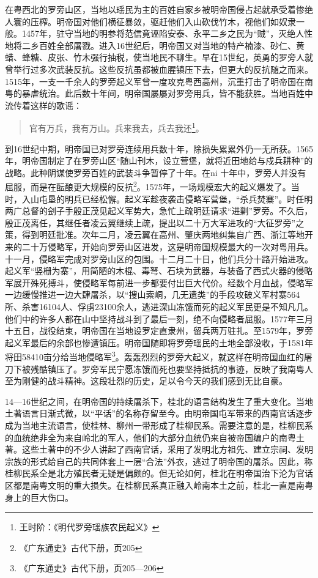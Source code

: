 在粤西北的罗旁山区，当地以瑶民为主的百姓自家乡被明帝国侵占起就承受着惨绝人寰的压榨。明帝国对他们横征暴敛，驱赶他们入山砍伐竹木，视他们如奴隶一般。1457年，驻守当地的明参将范信竟诬陷安泰、永平二乡之民为“贼”，灭绝人性地将二乡百姓全部屠戮。进入16世纪后，明帝国又对当地的特产楠漆、砂仁、黄蜡、蜂糖、皮张、竹木强行抽税，使当地民不聊生。早在15世纪，英勇的罗旁人就曾举行过多次武装反抗。这些反抗虽都被血腥镇压下去，但更大的反抗随之而来。1515年，一支一千余人的罗旁起义军曾一度攻克粤西高州，沉重打击了明帝国在南粤的暴虐统治。此后数十年间，明帝国屡屡对罗旁用兵，皆不能获胜。当地百姓中流传着这样的歌谣：

\begin{quote}

官有万兵，我有万山。兵来我去，兵去我还\footnote{王时阶：《明代罗旁瑶族农民起义》}。

\end{quote}

到16世纪中期，明帝国已对罗旁连续用兵数十年，除损失累累外仍一无所获。1565年，明帝国制定了在罗旁山区“随山刊木，设立营堡，就将近田地给与戍兵耕种”的战略。此种阴谋使罗旁百姓的武装斗争暂停了十年。在ni 十年中，罗旁人并没有屈服，而是在酝酿更大规模的反抗\footnote{《广东通史》古代下册，页205}。1575年，一场规模宏大的起义爆发了。当时，入山屯垦的明兵已经松懈。起义军趁夜袭击侵略军营堡，“杀兵焚寨”。时任明两广总督的刽子手殷正茂见起义军势大，急忙上疏明廷请求“进剿”罗旁。不久后，殷正茂离任，其继任者凌云翼继续上疏，提出以二十万大军进攻的“大征罗旁”之策，得到明廷批准。次年二月，凌云翼在高州、肇庆两地纠集自广西、浙江等地开来的二十万侵略军，开始向罗旁山区进发，这是明帝国规模最大的一次对粤用兵。十一月，侵略军完成对罗旁山区的包围。十二月二十日，他们兵分十路开始进攻。起义军“竖栅为寨”，用简陋的木棍、毒弩、石块为武器，与装备了西式火器的侵略军展开殊死搏斗，使侵略军每前进一步都要付出巨大代价。经数个月血战，侵略军一边缓慢推进一边大肆屠杀，以“搜山索峒，几无遗类”的手段攻破义军村寨564所、杀害16104人、俘虏23100余人，逃进深山冻饿而死的起义军民更是不知凡几。他们中的许多人都在山中坚持战斗到了最后一刻，绝不向侵略者屈服。1577年三月十五日，战役结束，明帝国在当地设罗定直隶州，留兵两万驻扎。至1579年，罗旁起义军最后的余部也惨遭镇压。明帝国随即将罗旁瑶民的土地全部没收，于1581年将田58410亩分给当地侵略军\footnote{《广东通史》古代下册，页205—206}。轰轰烈烈的罗旁大起义，就这样在明帝国血红的屠刀下被残酷镇压了。罗旁军民宁愿冻饿而死也要坚持抵抗的事迹，反映了我南粤人至为刚健的战斗精神。这段壮烈的历史，足以令今天的我们感到无比自豪。

14—16世纪之间，在明帝国的持续屠杀下，桂北的语言结构发生了重大变化。当地土著语言日渐式微，以“平话”的名称存留至今。由明帝国屯军带来的西南官话逐步成为当地主流语言，使桂林、柳州一带形成了桂柳民系。需要注意的是，桂柳民系的血统绝非全为来自岭北的军人，他们的大部分血统仍来自被帝国编户的南粤土著。这些土著中的不少人讲起了西南官话，采用了发明北方祖先、建立宗祠、发明宗族的形式给自己的共同体套上一层“合法”外衣，逃过了明帝国的屠杀。因此，称桂柳民系全是北方殖民者无疑是偏颇的。但无论如何，桂北在明帝国治下沦为官话区都是南粤文明的重大损失。在桂柳民系真正融入岭南本土之前，桂北一直是南粤身上的巨大伤口。

